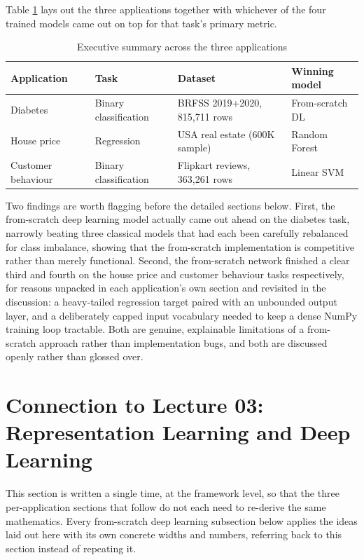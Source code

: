 \documentclass[11pt]{article}
\begin{document}
Table \ref{tab:exec-summary} lays out the three applications together with whichever of
the four trained models came out on top for that task's primary metric.

\begin{table}[H]
\centering
\caption{Executive summary across the three applications}
\label{tab:exec-summary}
\begin{tabular}{llll}
\toprule
Application & Task & Dataset & Winning model \\
\midrule
Diabetes & Binary classification & BRFSS 2019+2020, 815,711 rows & From-scratch DL \\
House price & Regression & USA real estate (600K sample) & Random Forest \\
Customer behaviour & Binary classification & Flipkart reviews, 363,261 rows & Linear SVM \\
\bottomrule
\end{tabular}
\end{table}

Two findings are worth flagging before the detailed sections below. First, the
from-scratch deep learning model actually came out ahead on the diabetes task, narrowly
beating three classical models that had each been carefully rebalanced for class
imbalance, showing that the from-scratch implementation is competitive rather than
merely functional. Second, the from-scratch network finished a clear third and fourth on
the house price and customer behaviour tasks respectively, for reasons unpacked in each
application's own section and revisited in the discussion: a heavy-tailed regression
target paired with an unbounded output layer, and a deliberately capped input vocabulary
needed to keep a dense NumPy training loop tractable. Both are genuine, explainable
limitations of a from-scratch approach rather than implementation bugs, and both are
discussed openly rather than glossed over.

\section{Connection to Lecture 03: Representation Learning and Deep Learning}
\label{sec:lecture}

This section is written a single time, at the framework level, so that the three
per-application sections that follow do not each need to re-derive the same mathematics.
Every from-scratch deep learning subsection below applies the ideas laid out here with its
own concrete widths and numbers, referring back to this section instead of repeating it.
\end{document}
